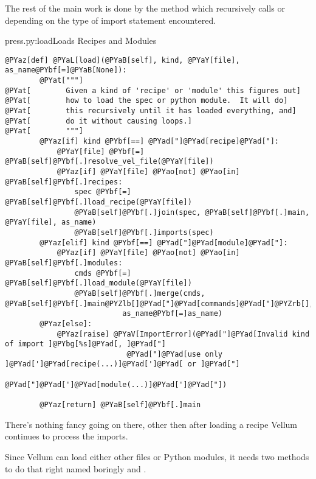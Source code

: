 The rest of the main work is done by the  method which recursively
calls  or  depending on the type of
import statement encountered.


\begin{code}{press.py:load}{Loads Recipes and Modules}
\begin{Verbatim}[commandchars=@\[\]]
    @PYaz[def] @PYaL[load](@PYaB[self], kind, @PYaY[file], as_name@PYbf[=]@PYaB[None]):
        @PYat["""]
@PYat[        Given a kind of 'recipe' or 'module' this figures out]
@PYat[        how to load the spec or python module.  It will do]
@PYat[        this recursively until it has loaded everything, and]
@PYat[        do it without causing loops.]
@PYat[        """]
        @PYaz[if] kind @PYbf[==] @PYad["]@PYad[recipe]@PYad["]:
            @PYaY[file] @PYbf[=] @PYaB[self]@PYbf[.]resolve_vel_file(@PYaY[file])
            @PYaz[if] @PYaY[file] @PYao[not] @PYao[in] @PYaB[self]@PYbf[.]recipes:
                spec @PYbf[=] @PYaB[self]@PYbf[.]load_recipe(@PYaY[file])
                @PYaB[self]@PYbf[.]join(spec, @PYaB[self]@PYbf[.]main, @PYaY[file], as_name)
                @PYaB[self]@PYbf[.]imports(spec)
        @PYaz[elif] kind @PYbf[==] @PYad["]@PYad[module]@PYad["]:
            @PYaz[if] @PYaY[file] @PYao[not] @PYao[in] @PYaB[self]@PYbf[.]modules:
                cmds @PYbf[=] @PYaB[self]@PYbf[.]load_module(@PYaY[file])
                @PYaB[self]@PYbf[.]merge(cmds, @PYaB[self]@PYbf[.]main@PYZlb[]@PYad["]@PYad[commands]@PYad["]@PYZrb[], 
                           as_name@PYbf[=]as_name)
        @PYaz[else]:
            @PYaz[raise] @PYaV[ImportError](@PYad["]@PYad[Invalid kind of import ]@PYbg[%s]@PYad[, ]@PYad["]
                            @PYad["]@PYad[use only ]@PYad[']@PYad[recipe(...)]@PYad[']@PYad[ or ]@PYad["]
                            @PYad["]@PYad[']@PYad[module(...)]@PYad[']@PYad["])

        @PYaz[return] @PYaB[self]@PYbf[.]main
\end{Verbatim}

\end{code}

There's nothing fancy going on there, other then after loading a recipe
Vellum continues to process the imports.

Since Vellum can load either other  files or Python modules, it
needs two methods to do that right named boringly  and
.


